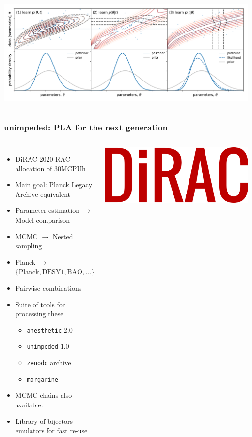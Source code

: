 \documentclass[aspectratio=169]{beamer}
\begin{document}
\begin{frame}
\begin{columns}
        \includegraphics[width=\textwidth]{figures/three_ways_II.pdf}
    \end{columns}
\end{frame}

\begin{frame}
    \frametitle{unimpeded: PLA for the next generation}
    \begin{columns}
        \begin{itemize}
            \item DiRAC 2020 RAC allocation of 30MCPUh
            \item Main goal: Planck Legacy Archive equivalent
            \item Parameter estimation $\to$ Model comparison
            \item MCMC $\to$ Nested sampling
            \item Planck $\to$ $\{\text{Planck}, \text{DESY1}, \text{BAO}, \ldots \}$
            \item Pairwise combinations
            \item Suite of tools for processing these 
                \begin{itemize}
                    \item \texttt{anesthetic} $2.0$
                    \item \texttt{unimpeded} $1.0$
                    \item \texttt{zenodo} archive
                    \item \texttt{margarine}
                \end{itemize}
            \item MCMC chains also available.
            \item Library of bijectors emulators for fast re-use
        \end{itemize}
        \includegraphics[width=\textwidth]{logos/dirac}

\end{columns}
\end{frame}
\end{document}
